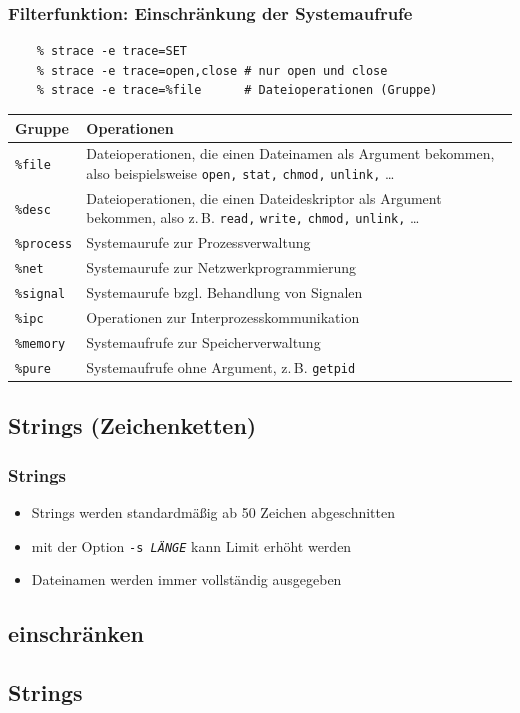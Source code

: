 \begin{frame}[fragile]
  \frametitle{Filterfunktion: Einschränkung der Systemaufrufe}

  \begin{lstlisting}
    % strace -e trace=SET
    % strace -e trace=open,close # nur open und close
    % strace -e trace=%file      # Dateioperationen (Gruppe)
  \end{lstlisting}

  \begin{center}
    \begin{tabular}{|p{2cm}p{8.5cm}|}
      \hline
      \textbf{Gruppe} & \textbf{Operationen} \\
      \hline
      \texttt{\%file}          & Dateioperationen, die einen Dateinamen als Argument
                                bekommen, also beispielsweise \texttt{open,} \texttt{stat,}
                                \texttt{chmod,} \texttt{unlink,} … \\
      \texttt{\%desc}          & Dateioperationen, die einen Dateideskriptor als \newline
                                 Argument bekommen, also z.\,B. \texttt{read,} \texttt{write,}
                                \texttt{chmod,} \texttt{unlink,} … \\
      \texttt{\%process}       & Systemaurufe zur Prozessverwaltung \\
      \texttt{\%net}           & Systemaurufe zur Netzwerkprogrammierung \\
      \texttt{\%signal}        & Systemaurufe bzgl. Behandlung von Signalen \\
      \texttt{\%ipc}           & Operationen zur Interprozesskommunikation \\
      \texttt{\%memory}        & Systemaufrufe zur Speicherverwaltung \\
      \texttt{\%pure}          & Systemaufrufe ohne Argument, z.\,B. \texttt{getpid} \\
      \hline
    \end{tabular}
  \end{center}

\end{frame}



\subsection{Strings (Zeichenketten)}

\begin{frame}[fragile]
  \frametitle{Strings}

  \begin{itemize}
    \item Strings werden standardmäßig ab 50 Zeichen abgeschnitten
    \item mit der Option \texttt{-s \emph{LÄNGE}} kann Limit erhöht werden
    \item Dateinamen werden immer vollständig ausgegeben
  \end{itemize}

\end{frame}


\subsection{\strace{} einschränken}


\subsection{Strings}
